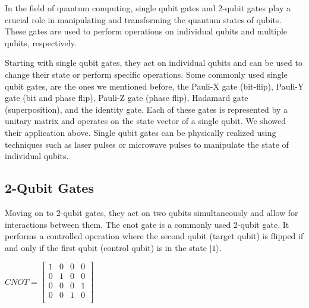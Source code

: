 \documentclass[inscr,ack,preface]{diphdthesis}
\begin{document}
In the field of quantum computing, single \acrshort{qubit} gates and 2-\acrshort{qubit} gates play a crucial role in manipulating and transforming the quantum states of \acrshort{qubit}s. These gates are used to perform operations on individual \acrshort{qubit}s and multiple \acrshort{qubit}s, respectively.

Starting with single \acrshort{qubit} gates, they act on individual \acrshort{qubit}s and can be used to change their state or perform specific operations. Some commonly used single \acrshort{qubit} gates, are the ones we mentioned before, the Pauli-X gate (bit-flip), Pauli-Y gate (bit and phase flip), Pauli-Z gate (phase flip), Hadamard gate (superposition), and the identity gate. Each of these gates is represented by a unitary matrix and operates on the state vector of a single \acrshort{qubit}. We showed their application above. Single \acrshort{qubit} gates can be physically realized using techniques such as laser pulses or microwave pulses to manipulate the state of individual \acrshort{qubit}s\cite{microwave}.

\subsection{2-Qubit Gates}
Moving on to 2-\acrshort{qubit} gates, they act on two \acrshort{qubit}s simultaneously and allow for interactions between them. The \acrfull{cnot} gate is a commonly used 2-\acrshort{qubit} gate. It performs a controlled operation where the second \acrshort{qubit} (target \acrshort{qubit}) is flipped if and only if the first \acrshort{qubit} (control \acrshort{qubit}) is in the state $|1\rangle$.
    \begin{center}
    \Large
    $CNOT = 
        \begin{bmatrix}
            1 & 0 & 0 & 0 \\
            0 & 1 & 0 & 0 \\
            0 & 0 & 0 & 1 \\
            0 & 0 & 1 & 0 \\
        \end{bmatrix}$
    \end{center}
\normalsize
\end{document}
